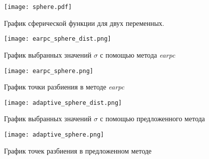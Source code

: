 \begin{figure}
    \centering
    \texttt{[image: sphere.pdf]}
    \caption{График сферической функции для двух переменных.}
    \label{sphere_plot}
\end{figure}

\begin{figure}
    \centering
    \label{earpc_sphere_dist}
    \texttt{[image: earpc\_sphere\_dist.png]}
    \caption{График выбранных значений $\sigma$ с помощью метода \textit{earpc}}
\end{figure}


\begin{figure}
\label{earpc_sphere}
    \centering
    \texttt{[image: earpc\_sphere.png]}
    \caption{График точки разбиения в методе \textit{earpc}}
\end{figure}

\begin{figure}
\label{adaptive_sphere}
    \centering
    \texttt{[image: adaptive\_sphere\_dist.png]}
    \caption{График выбранных значений $\sigma$ с помощью предложенного метода}
\end{figure}

\begin{figure}
    \centering
    \texttt{[image: adaptive\_sphere.png]}
    \caption{График точек разбиения в предложенном методе}
\end{figure}


